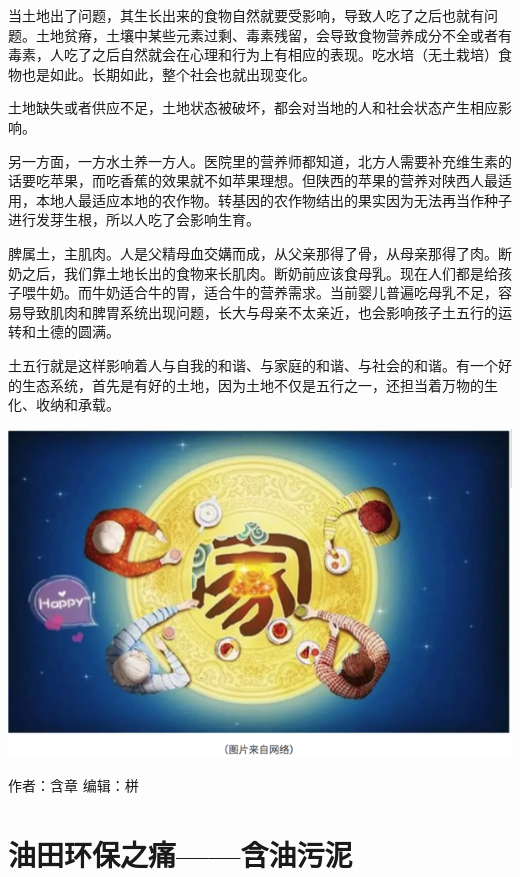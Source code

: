 \documentclass[
]{book}
\begin{document}
当土地出了问题，其生长出来的食物自然就要受影响，导致人吃了之后也就有问题。土地贫瘠，土壤中某些元素过剩、毒素残留，会导致食物营养成分不全或者有毒素，人吃了之后自然就会在心理和行为上有相应的表现。吃水培（无土栽培）食物也是如此。长期如此，整个社会也就出现变化。

土地缺失或者供应不足，土地状态被破坏，都会对当地的人和社会状态产生相应影响。

另一方面，一方水土养一方人。医院里的营养师都知道，北方人需要补充维生素的话要吃苹果，而吃香蕉的效果就不如苹果理想。但陕西的苹果的营养对陕西人最适用，本地人最适应本地的农作物。转基因的农作物结出的果实因为无法再当作种子进行发芽生根，所以人吃了会影响生育。

脾属土，主肌肉。人是父精母血交媾而成，从父亲那得了骨，从母亲那得了肉。断奶之后，我们靠土地长出的食物来长肌肉。断奶前应该食母乳。现在人们都是给孩子喂牛奶。而牛奶适合牛的胃，适合牛的营养需求。当前婴儿普遍吃母乳不足，容易导致肌肉和脾胃系统出现问题，长大与母亲不太亲近，也会影响孩子土五行的运转和土德的圆满。

土五行就是这样影响着人与自我的和谐、与家庭的和谐、与社会的和谐。有一个好的生态系统，首先是有好的土地，因为土地不仅是五行之一，还担当着万物的生化、收纳和承载。

\includegraphics[width=8.33in]{images/swr4}

作者：含章
编辑：栟

\hypertarget{ux6cb9ux7530ux73afux4fddux4e4bux75dbux542bux6cb9ux6c61ux6ce5}{%
\section{油田环保之痛------含油污泥}\label{ux6cb9ux7530ux73afux4fddux4e4bux75dbux542bux6cb9ux6c61ux6ce5}}
\end{document}
